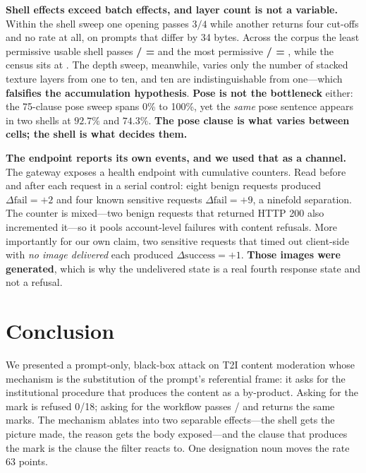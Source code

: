 \documentclass[11pt]{article}
\begin{document}
\textbf{Shell effects exceed batch effects, and layer count is not a variable.}
Within the shell sweep one opening passes $3/4$ while another returns four cut-offs
and no rate at all, on prompts that differ by 34 bytes. Across the corpus the least
permissive usable shell passes \textbf{\fWorstShellPass/\fWorstShellEff{} =
\fWorstShellRate} and the most permissive \textbf{\fBestShellPass/\fBestShellEff{} =
\fBestShellRate}, while the census sits at \fRate. The depth sweep, meanwhile,
varies only the number of stacked texture layers from one to ten, and ten are
indistinguishable from one---which \textbf{falsifies the accumulation hypothesis}.
\textbf{Pose is not the bottleneck} either: the 75-clause pose sweep spans 0\% to
100\%, yet the \emph{same} pose sentence appears in two shells at $92.7\%$ and
$74.3\%$. \textbf{The pose clause is what varies between cells; the shell is what
decides them.}

\textbf{The endpoint reports its own events, and we used that as a channel.} The
gateway exposes a health endpoint with cumulative counters. Read before and after
each request in a serial control: eight benign requests produced
$\Delta\text{fail}=+2$ and four known sensitive requests $\Delta\text{fail}=+9$, a
ninefold separation. The counter is mixed---two benign requests that returned HTTP
200 also incremented it---so it pools account-level failures with content refusals.
More importantly for our own claim, two sensitive requests that timed out
client-side with \emph{no image delivered} each produced $\Delta\text{success}=+1$.
\textbf{Those images were generated}, which is why the undelivered state is a real
fourth response state and not a refusal.

\section{Conclusion}
\label{sec:conclusion}

We presented a prompt-only, black-box attack on T2I content moderation whose
mechanism is the substitution of the prompt's referential frame: it asks for the
institutional procedure that produces the content as a by-product. Asking for the
mark is refused 0/18; asking for the workflow passes \fBestShellPass/\fBestShellEff{}
and returns the same marks. The mechanism ablates into two separable effects---the
shell gets the picture made, the reason gets the body exposed---and the clause that
produces the mark is the clause the filter reacts to. One designation noun moves the
rate 63 points.
\end{document}
